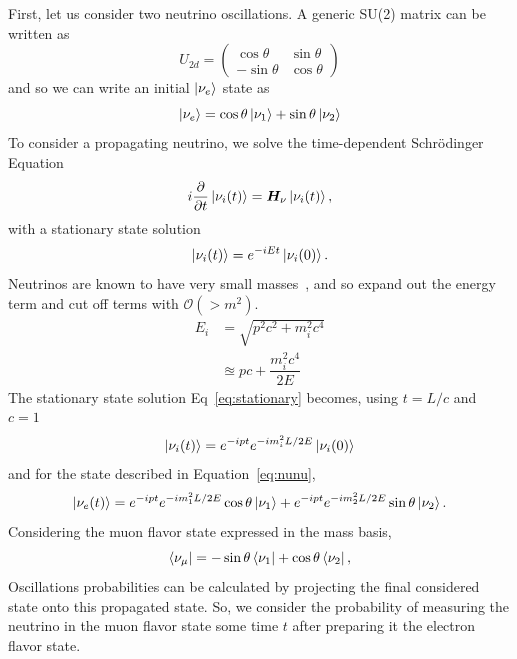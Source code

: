 \documentclass[main.tex]{subfiles}
\begin{document}
First, let us consider two neutrino oscillations.
A generic SU(2) matrix can be written as 
\begin{equation}
    U_{2d}=\left(\begin{array}{cc} \cos\theta & \sin\theta \\ -\sin\theta & \cos\theta \end{array}\right)
\end{equation}
and so we can write an initial $\left| \nu_{e} \right >$ state as 
\begin{equation}
    \left| \nu_{e} \right > = \cos\theta \left| \nu_{1} \right > + \sin\theta \left| \nu_{2} \right > 
\end{equation}
To consider a propagating neutrino, we solve the time-dependent Schr\"odinger Equation
\begin{equation}
    i\dfrac{\partial}{\partial t} \left| \nu_{i} (t) \right > = \bm{H}_{\nu}\left| \nu_{i}(t) \right >,
\end{equation}
with a stationary state solution
\begin{equation}\label{eq:stationary}
    \left| \nu_{i} (t) \right >  =  e^{-iEt} \left| \nu_{i} (0) \right >.
\end{equation}
Neutrinos are known to have very small masses~\cite{KATRIN:2021uub}, and so expand out the energy term and cut off terms with $\mathcal{O}(>m^{2})$. 
\begin{align}
    E_{i} &= \sqrt{p^{2}c^{2} + m_{i}^{2}c^{4}} \\
    &\approxeq pc + \dfrac{m_{i}^{2}c^{4}}{2E}
\end{align}
The stationary state solution Eq~\eqref{eq:stationary} becomes, using $t=L/c$ and $c=1$ 
\begin{equation}
    \left| \nu_{i} (t) \right >  =  e^{-ipt}e^{ -im_{i}^{2}L/2E}\left| \nu_{i} (0) \right >
\end{equation}
and for the state described in Equation~\eqref{eq:nunu},
\begin{equation}
    \left| \nu_{e}(t) \right > = e^{-ipt}e^{ -im_{1}^{2}L/2E} \cos\theta \left| \nu_{1} \right >  + e^{-ipt}e^{ -im_{2}^{2}L/2E} \sin\theta \left| \nu_{2} \right >.
\end{equation}
Considering the muon flavor state expressed in the mass basis,
\begin{equation}
    \left< \nu_{\mu} \right | = -\sin\theta\left< \nu_{1} \right | + \cos\theta\left< \nu_{2} \right |,
\end{equation}
Oscillations probabilities can be calculated by projecting the final considered state onto this propagated state.
So, we consider the probability of measuring the neutrino in the muon flavor state some time $t$ after preparing it the electron flavor state. 
\end{document}
